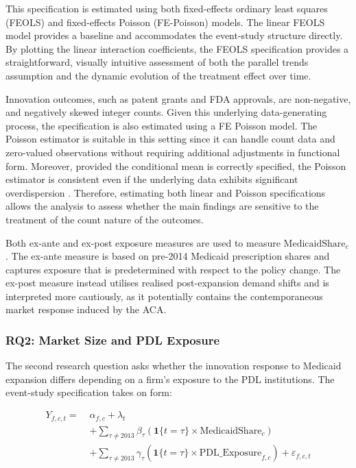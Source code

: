 \documentclass[12pt]{article}
\begin{document}
This specification is estimated using both fixed-effects ordinary least squares (FEOLS) and fixed-effects Poisson (FE-Poisson) models. The linear FEOLS model provides a baseline and accommodates the event-study structure directly. By plotting the linear interaction coefficients, the FEOLS specification provides a straightforward, visually intuitive assessment of both the parallel trends assumption and the dynamic evolution of the treatment effect over time.

Innovation outcomes, such as patent grants and FDA approvals, are non-negative, and negatively skewed integer counts. Given this underlying data-generating process, the specification is also estimated using a FE Poisson model. The Poisson estimator is suitable in this setting since it can handle count data and zero-valued observations without requiring additional adjustments in functional form. Moreover, provided the conditional mean is correctly specified, the Poisson estimator is consistent even if the underlying data exhibits significant overdispersion \cite{wooldridge1999distribution}. Therefore, estimating both linear and Poisson specifications allows the analysis to assess whether the main findings are sensitive to the treatment of the count nature of the outcomes.

Both ex-ante and ex-post exposure measures are used to measure $\text{MedicaidShare}_{c}$. The ex-ante measure is based on pre-2014 Medicaid prescription shares and captures exposure that is predetermined with respect to the policy change. The ex-post measure instead utilises realised post-expansion demand shifts and is interpreted more cautiously, as it potentially contains the contemporaneous market response induced by the ACA.

\subsubsection{RQ2: Market Size and PDL Exposure}

The second research question asks whether the innovation response to Medicaid expansion differs depending on a firm's exposure to the PDL institutions. The event-study specification takes on form:

\begin{equation}
\begin{aligned}
Y_{f,c,t} =\;&
\alpha_{f,c} + \lambda_t \\
&+
\sum_{\tau \neq 2013} \beta_{\tau}\left(\mathbf{1}\{t=\tau\} \times \text{MedicaidShare}_c\right) \\
&+
\sum_{\tau \neq 2013} \gamma_{\tau}\left(\mathbf{1}\{t=\tau\} \times \text{PDL\_Exposure}_{f,c}\right)
+ \varepsilon_{f,c,t}
\end{aligned}
\end{equation}
\end{document}
